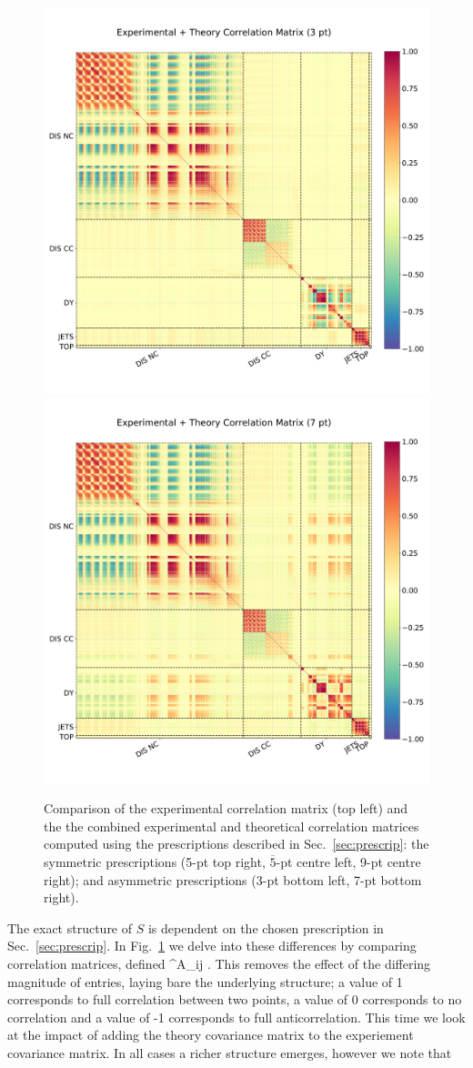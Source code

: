 \begin{figure}[H]
\begin{center}
\vskip-0.5cm
\includegraphics[width=0.49\linewidth]{mhous/plots/expth_corrmat_3pt.pdf}
    \includegraphics[width=0.49\linewidth]{mhous/plots/expth_corrmat_7pt.pdf}
    \caption{\small Comparison of the experimental correlation matrix (top left) and the
      the combined experimental and theoretical correlation matrices computed using the prescriptions described in Sec.~\ref{sec:prescrip}: the symmetric prescriptions (5-pt top right, $\overline{5}$-pt centre left, 9-pt centre right); and asymmetric prescriptions (3-pt bottom left, 7-pt bottom right).
  \label{fig:corrmats} }
  \end{center}
\end{figure}
The exact structure of $S$ is dependent on the chosen prescription in Sec.~\ref{sec:prescrip}. In Fig.~\ref{fig:corrmats} we delve into these differences by comparing correlation matrices, defined
\be
{}^A_{ij} \equiv {}.
\ee
This removes the effect of the differing magnitude of entries, laying bare the underlying structure; a value of 1 corresponds to full correlation between two points, a value of 0 corresponds to no correlation and a value of -1 corresponds to full anticorrelation. This time we look at the impact of adding the theory covariance matrix to the experiement covariance matrix. In all cases a richer structure emerges, however we note that
